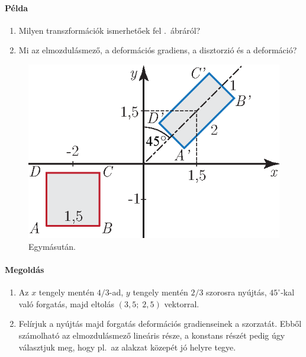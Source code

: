 \documentclass[12pt,a4paper]{scrartcl}
\begin{document}
\paragraph{Példa}
\begin{enumerate}
\item Milyen transzformációk ismerhetőek fel .\ ábráról?
\item Mi az elmozdulásmező, a deformációs gradiens, a disztorzió és a deformáció?
\end{enumerate}
\begin{figure}[htb] 
\centering    
\includegraphics[scale=1]{figs/egymasutan_feladat.eps}
\caption{Egymásután.}
\label{fig:egymasutan}
\end{figure}
\FloatBarrier

\paragraph{Megoldás}
\begin{enumerate}
\item Az $x$ tengely mentén $4/3$-ad, $y$ tengely mentén $2/3$ szorosra nyújtás, $45^\circ $-kal való forgatás, majd eltolás $\left( {3{,}5;\;2{,}5} \right)$ vektorral.
\item Felírjuk a nyújtás majd forgatás deformációs gradienseinek a szorzatát. Ebből számolható az elmozdulásmező lineáris része, a konstans részét pedig úgy választjuk meg, hogy pl.\ az alakzat közepét jó helyre tegye.
\end{enumerate}
\normalsize
\end{document}
